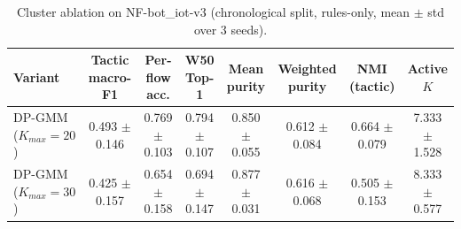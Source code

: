 \begin{table}[t]
\centering
\caption{Cluster ablation on NF-bot_iot-v3 (chronological split, rules-only, mean $\pm$ std over 3 seeds).}
\label{tab:ablation_cluster_v3}
\small
\begin{tabular}{lccccccc}
\toprule
Variant & Tactic macro-F1 & Per-flow acc. & W50 Top-1 & Mean purity & Weighted purity & NMI (tactic) & Active $K$ \\
\midrule
DP-GMM ($K_{max}=20$) & 0.493 $\pm$ 0.146 & 0.769 $\pm$ 0.103 & 0.794 $\pm$ 0.107 & 0.850 $\pm$ 0.055 & 0.612 $\pm$ 0.084 & 0.664 $\pm$ 0.079 & 7.333 $\pm$ 1.528 \\
DP-GMM ($K_{max}=30$) & 0.425 $\pm$ 0.157 & 0.654 $\pm$ 0.158 & 0.694 $\pm$ 0.147 & 0.877 $\pm$ 0.031 & 0.616 $\pm$ 0.068 & 0.505 $\pm$ 0.153 & 8.333 $\pm$ 0.577 \\
\bottomrule
\end{tabular}
\end{table}
